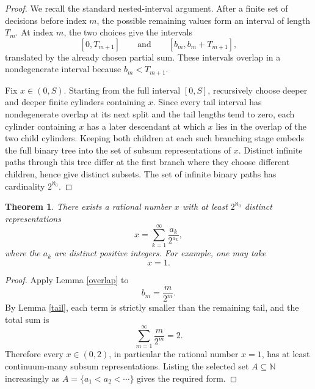 \documentclass[a4paper,11pt]{amsart}
\newtheorem{theorem}{Theorem}
\begin{document}
\begin{proof}
We recall the standard nested-interval argument.  After a finite set of
decisions before index \(m\), the possible remaining values form an interval of
length \(T_m\).  At index \(m\), the two choices give the intervals
\[
        [0,T_{m+1}]
        \qquad\text{and}\qquad
        [b_m,b_m+T_{m+1}],
\]
translated by the already chosen partial sum.  These intervals overlap in a
nondegenerate interval because \(b_m<T_{m+1}\).

Fix \(x\in(0,S)\).  Starting from the full interval \([0,S]\), recursively
choose deeper and deeper finite cylinders containing \(x\).  Since every tail
interval has nondegenerate overlap at its next split and the tail lengths tend
to zero, each cylinder containing \(x\) has a later descendant at which \(x\)
lies in the overlap of the two child cylinders.  Keeping both children at each
such branching stage embeds the full binary tree into the set of subsum
representations of \(x\).  Distinct infinite paths through this tree differ at
the first branch where they choose different children, hence give distinct
subsets.  The set of infinite binary paths has cardinality \(2^{\aleph_0}\).
\end{proof}

\begin{theorem}
There exists a rational number \(x\) with at least \(2^{\aleph_0}\) distinct
representations
\[
        x=\sum_{k=1}^{\infty}\frac{a_k}{2^{a_k}},
\]
where the \(a_k\) are distinct positive integers.  For example, one may take
\[
        x=1.
\]
\end{theorem}

\begin{proof}
Apply Lemma \ref{overlap} to
\[
        b_m=\frac m{2^m}.
\]
By Lemma \ref{tail}, each term is strictly smaller than the remaining tail, and
the total sum is
\[
        \sum_{m=1}^{\infty}\frac m{2^m}=2.
\]
Therefore every \(x\in(0,2)\), in particular the rational number \(x=1\), has
at least continuum-many subsum representations.  Listing the selected set
\(A\subseteq \mathbb N\) increasingly as \(A=\{a_1<a_2<\cdots\}\) gives the
required form.
\end{proof}
\end{document}
